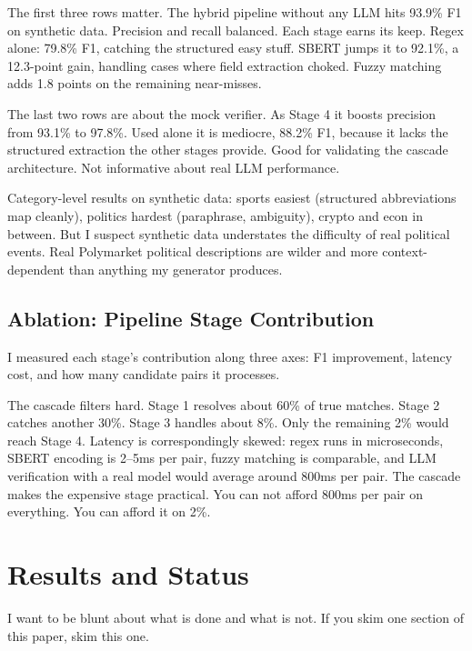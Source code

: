 \documentclass[11pt]{article}
\theoremstyle{definition}
\theoremstyle{remark}
\begin{document}
The first three rows matter. The hybrid pipeline without any LLM hits 93.9\% F1 on synthetic data. Precision and recall balanced. Each stage earns its keep. Regex alone: 79.8\% F1, catching the structured easy stuff. SBERT jumps it to 92.1\%, a 12.3-point gain, handling cases where field extraction choked. Fuzzy matching adds 1.8 points on the remaining near-misses.

The last two rows are about the mock verifier. As Stage 4 it boosts precision from 93.1\% to 97.8\%. Used alone it is mediocre, 88.2\% F1, because it lacks the structured extraction the other stages provide. Good for validating the cascade architecture. Not informative about real LLM performance.

Category-level results on synthetic data: sports easiest (structured abbreviations map cleanly), politics hardest (paraphrase, ambiguity), crypto and econ in between. But I suspect synthetic data understates the difficulty of real political events. Real Polymarket political descriptions are wilder and more context-dependent than anything my generator produces.

\subsection{Ablation: Pipeline Stage Contribution}
\label{sec:ablation}

I measured each stage's contribution along three axes: F1 improvement, latency cost, and how many candidate pairs it processes.

The cascade filters hard. Stage 1 resolves about 60\% of true matches. Stage 2 catches another 30\%. Stage 3 handles about 8\%. Only the remaining 2\% would reach Stage 4. Latency is correspondingly skewed: regex runs in microseconds, SBERT encoding is 2--5ms per pair, fuzzy matching is comparable, and LLM verification with a real model would average around 800ms per pair. The cascade makes the expensive stage practical. You can not afford 800ms per pair on everything. You can afford it on 2\%.

\section{Results and Status}
\label{sec:results}

I want to be blunt about what is done and what is not. If you skim one section of this paper, skim this one.
\end{document}
